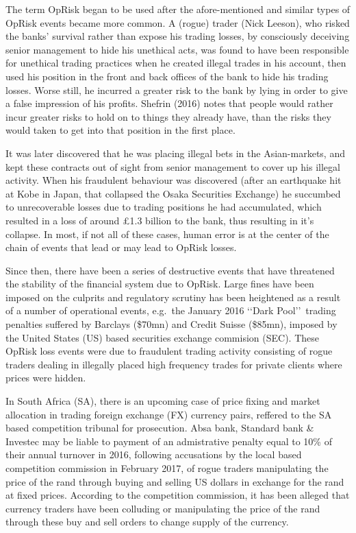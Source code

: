 \documentclass{DissertateUSU}
\begin{document}
The term OpRisk began to be used after the afore-mentioned and similar
types of OpRisk events became more common. A (rogue) trader (Nick
Leeson), who risked the banks' survival rather than expose his trading
losses, by consciously deceiving senior management to hide his unethical
acts, was found to have been responsible for unethical trading practices
when he created illegal trades in his account, then used his position in
the front and back offices of the bank to hide his trading losses. Worse
still, he incurred a greater risk to the bank by lying in order to give
a false impression of his profits. Shefrin (2016) notes that people
would rather incur greater risks to hold on to things they already have,
than the risks they would taken to get into that position in the first
place.\medskip

It was later discovered that he was placing illegal bets in the
Asian-markets, and kept these contracts out of sight from senior
management to cover up his illegal activity. When his fraudulent
behaviour was discovered (after an earthquake hit at Kobe in Japan, that
collapsed the Osaka Securities Exchange) he succumbed to unrecoverable
losses due to trading positions he had accumulated, which resulted in a
loss of around \pounds 1.3 billion to the bank, thus resulting in it's
collapse. In most, if not all of these cases, human error is at the
center of the chain of events that lead or may lead to OpRisk
losses.\medskip\medskip

Since then, there have been a series of destructive events that have
threatened the stability of the financial system due to OpRisk. Large
fines have been imposed on the culprits and regulatory scrutiny has been
heightened as a result of a number of operational events, e.g.~the
January 2016 \lq\lq Dark Pool\rq\rq~trading penalties suffered by
Barclays (\$70mn) and Credit Suisse (\$85mn), imposed by the United
States (US) based securities exchange commision (SEC). These OpRisk loss
events were due to fraudulent trading activity consisting of rogue
traders dealing in illegally placed high frequency trades for private
clients where prices were hidden.\medskip 

In South Africa (SA), there is an upcoming case of price fixing and
market allocation in trading foreign exchange (FX) currency pairs,
reffered to the SA based competition tribunal for prosecution. Absa
bank, Standard bank \& Investec may be liable to payment of an
admistrative penalty equal to 10\% of their annual turnover in 2016,
following accusations by the local based competition commission in
February 2017, of rogue traders manipulating the price of the rand
through buying and selling US dollars in exchange for the rand at fixed
prices. According to the competition commission, it has been alleged
that currency traders have been colluding or manipulating the price of
the rand through these buy and sell orders to change supply of the
currency.\medskip
\end{document}
